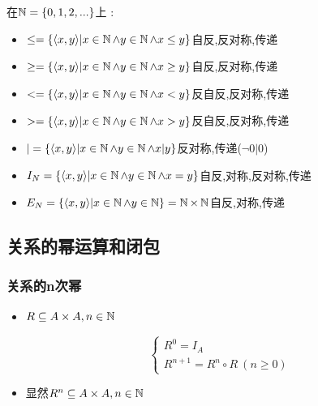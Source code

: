 {{{{    在$\operatorname{\mathbb{N}} = \left\{ 0,1,2,... \right\}$上 : \begin{itemize}
      \item $\leq = \left\{ \langle x,y\rangle | x \in \operatorname{\mathbb{N}} \land y \in \operatorname{\mathbb{N}} \land x \leq y \right\}$自反,反对称,传递
      \item $\geq = \left\{ \langle x,y\rangle | x \in \operatorname{\mathbb{N}} \land y \in \operatorname{\mathbb{N}} \land x \geq y \right\}$自反,反对称,传递
      \item $< = \left\{ \langle x,y\rangle | x \in \operatorname{\mathbb{N}} \land y \in \operatorname{\mathbb{N}} \land x < y \right\}$反自反,反对称,传递
      \item $> = \left\{ \langle x,y\rangle | x \in \operatorname{\mathbb{N}} \land y \in \operatorname{\mathbb{N}} \land x > y \right\}$反自反,反对称,传递
      \item $| = \left\{ \langle x,y\rangle | x \in \operatorname{\mathbb{N}} \land y \in \operatorname{\mathbb{N}} \land x | y \right\}$反对称,传递($\lnot 0 | 0$)
      \item $I_N = \left\{ \langle x,y\rangle | x \in \operatorname{\mathbb{N}} \land y \in \operatorname{\mathbb{N}} \land x = y \right\}$自反,对称,反对称,传递
      \item $E_N = \left\{ \langle x,y\rangle | x \in \operatorname{\mathbb{N}} \land y \in \operatorname{\mathbb{N}} \right\} = \operatorname{\mathbb{N}} \times \operatorname{\mathbb{N}}$自反,对称,传递
    \end{itemize}
  }%

}%

\subsection{关系的幂运算和闭包}{

  \subsubsection{关系的n次幂}{
    \begin{itemize}
      \item {
            $R \subseteq A \times A,n \in \operatorname{\mathbb{N}}$

            $$
              \begin{cases}
                R^0 = I_A \\
                R^{n + 1} = R^n \circ R\ (n \geq 0)
              \end{cases}
            $$
            }
      \item {
            显然$R^n \subseteq A \times A,n \in \operatorname{\mathbb{N}}$
            }
    \end{itemize}

}}}}
